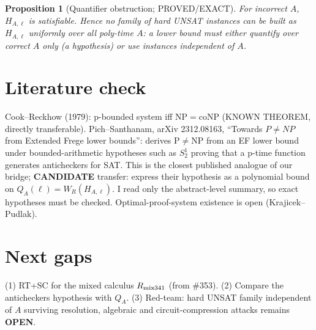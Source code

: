 \documentclass[11pt]{article}
\newtheorem{proposition}{Proposition}
\begin{document}
\begin{proposition}[Quantifier obstruction; PROVED/EXACT]
For incorrect $A$, $H_{A,\ell}$ is satisfiable. Hence no family of hard UNSAT instances can be built as $H_{A,\ell}$ uniformly over all poly-time $A$: a lower bound must either quantify over correct $A$ only (a hypothesis) or use instances independent of $A$.
\end{proposition}

\section*{Literature check}
Cook--Reckhow (1979): p-bounded system iff NP$=$coNP (KNOWN THEOREM, directly transferable). Pich--Santhanam, arXiv 2312.08163, ``Towards $P\ne NP$ from Extended Frege lower bounds'': derives P$\ne$NP from an EF lower bound under bounded-arithmetic hypotheses such as $S^1_2$ proving that a p-time function generates anticheckers for SAT. This is the closest published analogue of our bridge; \textbf{CANDIDATE} transfer: express their hypothesis as a polynomial bound on $Q_A(\ell)=W_R(H_{A,\ell})$. I read only the abstract-level summary, so exact hypotheses must be checked. Optimal-proof-system existence is open (Krajicek--Pudlak).

\section*{Next gaps}
(1) RT+SC for the mixed calculus $R_{\rm mix341}$ (from \#353). (2) Compare the anticheckers hypothesis with $Q_A$. (3) Red-team: hard UNSAT family independent of $A$ surviving resolution, algebraic and circuit-compression attacks remains \textbf{OPEN}.
\end{document}
